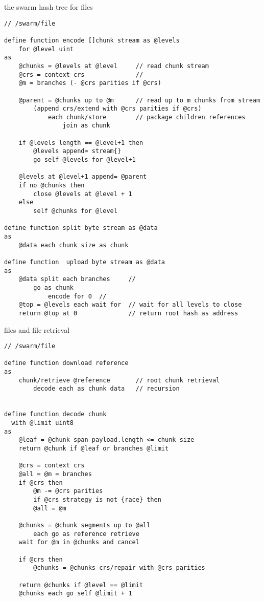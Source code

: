 \begin{definition}{the swarm hash tree for files}\label{def:swarm-hash}
\begin{lstlisting}[language=buzz1]
// /swarm/file

define function encode []chunk stream as @levels
    for @level uint
as
    @chunks = @levels at @level     // read chunk stream 
    @crs = context crs              // 
    @m = branches (- @crs parities if @crs) 
    
    @parent = @chunks up to @m      // read up to m chunks from stream
        (append crs/extend with @crs parities if @crs)
            each chunk/store        // package children references
                join as chunk
                
    if @levels length == @level+1 then
        @levels append= stream{}
        go self @levels for @level+1
    
    @levels at @level+1 append= @parent
    if no @chunks then
        close @levels at @level + 1
    else
        self @chunks for @level
            
define function split byte stream as @data
as
    @data each chunk size as chunk

define function  upload byte stream as @data
as
    @data split each branches     // 
        go as chunk 
            encode for 0  // 
    @top = @levels each wait for  // wait for all levels to close
    return @top at 0              // return root hash as address        
\end{lstlisting}
\end{definition}
                   

\begin{definition}{files and file retrieval}\label{def:file-retrieval}
\begin{lstlisting}[language=buzz1]
// /swarm/file

define function download reference
as
    chunk/retrieve @reference       // root chunk retrieval
        decode each as chunk data   // recursion


define function decode chunk
  with @limit uint8
as
    @leaf = @chunk span payload.length <= chunk size
    return @chunk if @leaf or branches @limit 
    
    @crs = context crs
    @all = @m = branches 
    if @crs then
        @m -= @crs parities
        if @crs strategy is not {race} then 
        @all = @m 
        
    @chunks = @chunk segments up to @all 
        each go as reference retrieve 
    wait for @m in @chunks and cancel 

    if @crs then 
        @chunks = @chunks crs/repair with @crs parities 

    return @chunks if @level == @limit 
    @chunks each go self @limit + 1  

\end{lstlisting}
\end{definition}

